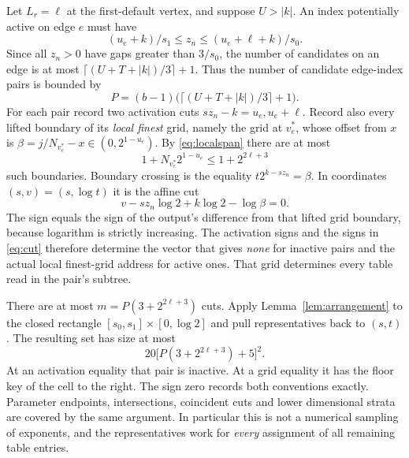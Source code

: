 \documentclass[11pt]{article}
\theoremstyle{definition}
\theoremstyle{remark}
\begin{document}
Let $L_r=\ell$ at the first-default vertex, and suppose $U>|k|$.
An index potentially active on edge $e$ must have
\[
 (u_e+k)/s_1\leq z_n\leq(u_e+\ell+k)/s_0.
\]
Since all $z_n>0$ have gaps greater than $3/s_0$, the number of candidates on
an edge is at most $\lceil(U+T+|k|)/3\rceil+1$. Thus the number of candidate
edge-index pairs is bounded by
\begin{equation}\label{eq:P}
 P=(b-1)\bigl(\lceil(U+T+|k|)/3\rceil+1\bigr).
\end{equation}
For each pair record two activation cuts $sz_n-k=u_e,u_e+\ell$.
Record also every lifted boundary of its \emph{local finest} grid, namely the
grid at $v_e^*$, whose offset from $x$ is
$\beta=j/N_{v_e^*}-x\in(0,2^{1-u_e})$. By
\eqref{eq:localspan} there are at most
\[
 1+N_{v_e^*}2^{1-u_e}\leq1+2^{2\ell+3}
\]
such boundaries. Boundary crossing is the equality
$t2^{k-sz_n}=\beta$. In coordinates $(s,v)=(s,\log t)$ it is the affine cut
\begin{equation}\label{eq:cut}
 v-sz_n\log2+k\log2-\log\beta=0.
\end{equation}
The sign equals the sign of the output's difference from that lifted grid
boundary, because logarithm is strictly increasing. The activation signs
and the signs in \eqref{eq:cut} therefore determine the vector that gives
\emph{none} for inactive pairs and the actual local finest-grid address for
active ones. That grid determines every table read in the pair's subtree.

There are at most $m=P(3+2^{2\ell+3})$ cuts. Apply
Lemma~\ref{lem:arrangement} to the closed rectangle
$[s_0,s_1]\times[0,\log2]$ and pull representatives back to $(s,t)$.
The resulting set has size at most
\begin{equation}\label{eq:repcount}
 20\bigl[P(3+2^{2\ell+3})+5\bigr]^2.
\end{equation}
At an activation equality that pair is inactive. At a grid equality it has
the floor key of the cell to the right. The sign zero records both conventions
exactly. Parameter endpoints, intersections, coincident cuts and lower
dimensional strata are covered by the same argument. In particular this is
not a numerical sampling of exponents, and the representatives work for
\emph{every} assignment of all remaining table entries.
\end{document}
